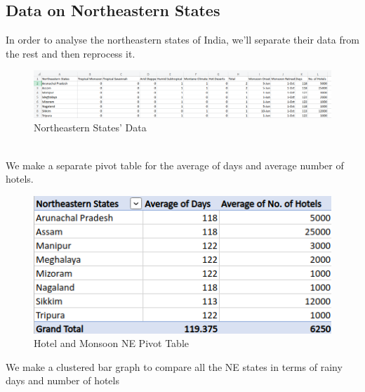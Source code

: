 \documentclass{report}
\begin{document}
\subsection{Data on Northeastern States}
In order to analyse the northeastern states of India, we'll separate their data from the rest and then reprocess it.
\begin{Center}
  \begin{figure}[h!]
    \includegraphics[width=1.35\textwidth]{NEData.png}
    \caption{Northeastern States' Data}
   \end{figure}
 \end{Center}
\\ We make a separate pivot table for the average of days and average number of hotels.
\begin{Center}
  \begin{figure}[h!]
    \includegraphics[width=1\textwidth]{NEPivotHotelandMonsoon.png}
    \caption{Hotel and Monsoon NE Pivot Table}
   \end{figure}
 \end{Center}
\newpage
We make a clustered bar graph to compare all the NE states in terms of rainy days and number of hotels
\end{document}
